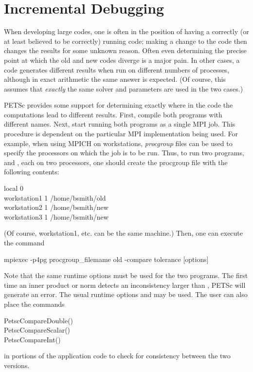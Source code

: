 {{{\section{Incremental Debugging} 

When developing large codes, one is often in the position of having a
correctly (or at least believed to be correctly) running code; making
a change to the code then changes the results for some unknown reason.
Often even determining the precise point at which the old and new
codes diverge is a major pain.  In other cases, a code generates
different results when run on different numbers of processes,
although in exact arithmetic the same answer is expected. (Of course,
this assumes that {\em exactly} the same solver and parameters are
used in the two cases.)

PETSc provides some support for determining exactly where in the code
the computations lead to different results. First, compile both programs
with different names.  Next, start running
both programs as a single MPI job. This procedure is dependent on the particular
MPI implementation being used.
For example, when using MPICH on workstations,
{\em procgroup} files can be used to specify the processors on which the job is
to be run.  Thus, to run two programs,  and ,
each on two processors, one should create the procgroup file with the
following contents:
\begin{tabbing}
   local 0\\
   workstation1 1 /home/bsmith/old\\
   workstation2 1 /home/bsmith/new\\
   workstation3 1 /home/bsmith/new\\
\end{tabbing}
(Of course, workstation1, etc. can be the same machine.) Then, one can
execute the command
\begin{tabbing}
   mpiexec -p4pg \trl{<}procgroup\_filemame\trl{>} old -compare \trl{<}tolerance\trl{>} [options]
\end{tabbing}
Note that the same runtime options must be used for the two programs.
The first time an inner product or norm detects an inconsistency larger
than , PETSc will generate an error. The usual runtime
options  and  may
be used.   The user can also place the commands
\begin{tabbing}
   PetscCompareDouble()\\
   PetscCompareScalar()\\
   PetscCompareInt()
\end{tabbing}
in portions of the application code to check for consistency between
the two versions.

}}}
